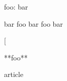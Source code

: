 
\def\mytitle{Variables}
\def\foo{bar foo bar foo bar}
\def\bat{**foo**}


foo:	bar

bar foo bar foo bar

[%

**foo**

article



